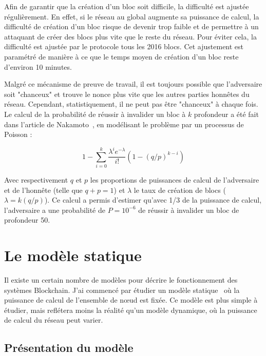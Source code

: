     Afin de garantir que la création d'un bloc soit difficile, la difficulté est
    ajustée régulièrement. En effet, si le réseau au global augmente sa
    puissance de calcul, la difficulté de création d'un bloc risque de devenir
    trop faible et de permettre à un attaquant de créer des blocs plus vite que
    le reste du réseau. Pour éviter cela, la difficulté est ajustée par le
    protocole tous les 2016 blocs. Cet ajustement est paramétré de manière à ce
    que le temps moyen de création d'un bloc reste d'environ 10 minutes.

    Malgré ce mécanisme de preuve de travail, il est toujours possible que
    l'adversaire soit "chanceux" et trouve le nonce plus vite que les autres
    parties honnêtes du réseau. Cependant, statistiquement, il ne peut pas être
    "chanceux" à chaque fois. Le calcul de la probabilité de réussir à invalider
    un bloc à $k$ profondeur a été fait dans l'article de
    Nakamoto~\cite{bitcoin}, en modélisant le problème par un processus de
    Poisson :
    
    \begin{equation}
        1 - \sum_{i=0}^{k} \frac{\lambda^i e^{-\lambda}}{i!} (1-(q/p)^{k-i})
    \end{equation}

    Avec respectivement $q$ et $p$ les proportions de puissances de calcul de
    l'adversaire et de l'honnête (telle que $q + p = 1$) et $\lambda$ le taux de
    création de blocs ($\lambda = k(q/p)$). Ce calcul a permis d'estimer 
    qu'avec 1/3 de la puissance de calcul, l'adversaire a une probabilité de
    $P = 10^{-6}$ de réussir à invalider un bloc de profondeur 50.


\section{Le modèle statique}\label{sec:statique}

    Il existe un certain nombre de modèles pour décrire le fonctionnement des
    systèmes Blockchain. J'ai commencé par étudier un modèle
    statique~\cite{static_backbone} où la puissance de calcul de l'ensemble de
    nœud est fixée. Ce modèle est plus simple à étudier, mais reflétera moins la
    réalité qu'un modèle dynamique, où la puissance de calcul du réseau peut
    varier.
    

    \subsection{Présentation du modèle}\label{subsec:statique-presentation}

